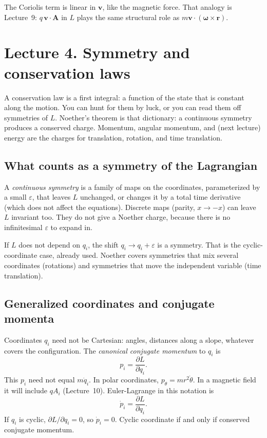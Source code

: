 \documentclass[11pt]{article}
\numberwithin{equation}{section}
\newcommand{\qdot}{\dot{q}}
\newcommand{\pd}[2]{\frac{\partial #1}{\partial #2}}
\newcommand{\vect}[1]{\mathbf{#1}}
\begin{document}
The Coriolis term is linear in $\vect{v}$, like the magnetic force. That analogy is Lecture~9: $q\,\vect{v}\cdot\vect{A}$ in $L$ plays the same structural role as $m\vect{v}\cdot(\vect{\omega}\times\vect{r})$.

\section{Lecture 4. Symmetry and conservation laws}

A conservation law is a first integral: a function of the state that is constant along the motion. You can hunt for them by luck, or you can read them off symmetries of $L$. Noether's theorem is that dictionary: a continuous symmetry produces a conserved charge. Momentum, angular momentum, and (next lecture) energy are the charges for translation, rotation, and time translation.

\subsection{What counts as a symmetry of the Lagrangian}

A \emph{continuous symmetry} is a family of maps on the coordinates, parameterized by a small $\varepsilon$, that leaves $L$ unchanged, or changes it by a total time derivative (which does not affect the equations). Discrete maps (parity, $x\to -x$) can leave $L$ invariant too. They do not give a Noether charge, because there is no infinitesimal $\varepsilon$ to expand in.

If $L$ does not depend on $q_i$, the shift $q_i\to q_i+\varepsilon$ is a symmetry. That is the cyclic-coordinate case, already used. Noether covers symmetries that mix several coordinates (rotations) and symmetries that move the independent variable (time translation).

\subsection{Generalized coordinates and conjugate momenta}

Coordinates $q_i$ need not be Cartesian: angles, distances along a slope, whatever covers the configuration. The \emph{canonical conjugate momentum} to $q_i$ is
\begin{equation}
\label{eq:pdef}
p_i = \pd{L}{\qdot_i}.
\end{equation}
This $p_i$ need not equal $m\dot q_i$. In polar coordinates, $p_\theta=m r^2\dot\theta$. In a magnetic field it will include $q A_i$ (Lecture~10). Euler-Lagrange in this notation is
\[
\dot p_i = \pd{L}{q_i}.
\]
If $q_i$ is cyclic, $\partial L/\partial q_i=0$, so $\dot p_i=0$. Cyclic coordinate if and only if conserved conjugate momentum.
\end{document}
